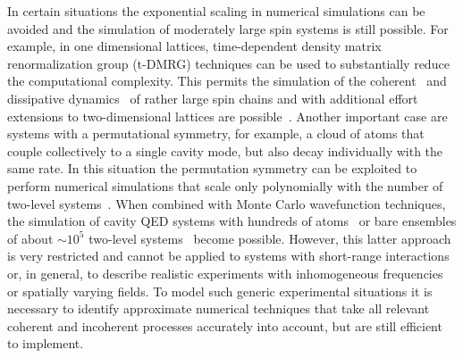 \documentclass[pra,twocolumn,showpacs,preprintnumbers,amsmath,amssymb,superscriptaddress]{revtex4-1}
\begin{document}
In certain situations the exponential scaling in numerical simulations can be avoided and the simulation of moderately large spin systems is still possible. For example, in one dimensional lattices, time-dependent density matrix renormalization group (t-DMRG) techniques can be used to substantially reduce the computational complexity.  This permits the simulation of the coherent~\cite{Daley2004,White2004,Vidal2004} and dissipative dynamics~\cite{Verstrate2004,Orus2008,Mascarenhas2015,Cui2015} of rather large spin chains and with additional effort extensions to two-dimensional lattices are possible~\cite{Kshetrimayum2017,Kilda2020,Keever2020,Yang2020}.  Another important case are systems with a permutational symmetry, for example, a cloud of atoms that couple collectively to a single cavity mode, but also decay individually with the same rate. In this situation the permutation symmetry can be exploited to perform numerical simulations that scale only polynomially with the number of two-level systems~\cite{Chase2008,Xu2013,Kirton2017,Shammah2018,Zhang2018,Shankar2021}. When combined with Monte Carlo wavefunction techniques, the simulation of cavity QED systems with hundreds of atoms~\cite{Kirton2017} or bare ensembles of about $\sim10^5$ two-level systems~\cite{Zhang2018} become possible. However, this latter approach is very restricted and cannot be applied to systems with short-range interactions or, in general, to describe realistic experiments with inhomogeneous frequencies or spatially varying fields. To model such generic  experimental situations it is necessary to identify approximate numerical techniques that take all relevant coherent and incoherent processes accurately into account, but  are still efficient to implement. 
 
\end{document}
